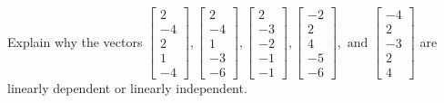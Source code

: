 \documentclass{article}
\begin{document}
\begin{exerciseStatement}
    Explain why the vectors \(\left[\begin{array}{r}
2 \\
-4 \\
2 \\
1 \\
-4
\end{array}\right] , \left[\begin{array}{r}
2 \\
-4 \\
1 \\
-3 \\
-6
\end{array}\right] , \left[\begin{array}{r}
2 \\
-3 \\
-2 \\
-1 \\
-1
\end{array}\right] , \left[\begin{array}{r}
-2 \\
2 \\
4 \\
-5 \\
-6
\end{array}\right] , \text{ and } \left[\begin{array}{r}
-4 \\
2 \\
-3 \\
2 \\
4
\end{array}\right]\) are linearly dependent or linearly independent.


  
\end{exerciseStatement}
\end{document}
